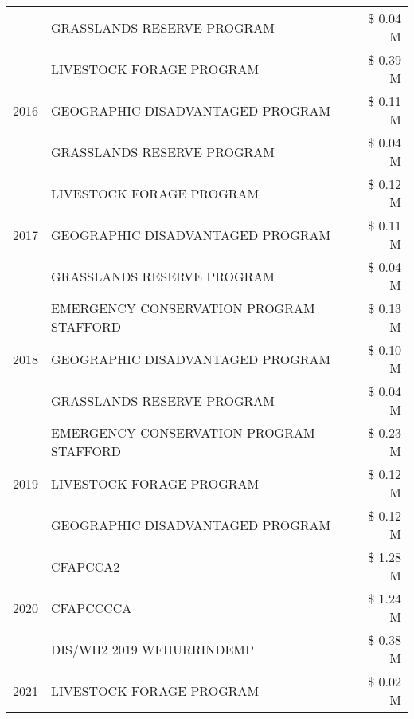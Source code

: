 \begin{tabular}{llr}
 & GRASSLANDS RESERVE PROGRAM & \$ 0.04 M \\
\cline{1-3}
\multirow[t]{3}{*}{2016} & LIVESTOCK FORAGE PROGRAM                      & \$ 0.39 M \\
 & GEOGRAPHIC DISADVANTAGED PROGRAM              & \$ 0.11 M \\
 & GRASSLANDS RESERVE PROGRAM                    & \$ 0.04 M \\
\cline{1-3}
\multirow[t]{3}{*}{2017} & LIVESTOCK FORAGE PROGRAM & \$ 0.12 M \\
 & GEOGRAPHIC DISADVANTAGED PROGRAM & \$ 0.11 M \\
 & GRASSLANDS RESERVE PROGRAM & \$ 0.04 M \\
\cline{1-3}
\multirow[t]{3}{*}{2018} & EMERGENCY CONSERVATION PROGRAM STAFFORD & \$ 0.13 M \\
 & GEOGRAPHIC DISADVANTAGED PROGRAM & \$ 0.10 M \\
 & GRASSLANDS RESERVE PROGRAM & \$ 0.04 M \\
\cline{1-3}
\multirow[t]{3}{*}{2019} & EMERGENCY CONSERVATION PROGRAM STAFFORD & \$ 0.23 M \\
 & LIVESTOCK FORAGE PROGRAM & \$ 0.12 M \\
 & GEOGRAPHIC DISADVANTAGED PROGRAM & \$ 0.12 M \\
\cline{1-3}
\multirow[t]{3}{*}{2020} & CFAPCCA2 & \$ 1.28 M \\
 & CFAPCCCCA & \$ 1.24 M \\
 & DIS/WH2 2019 WFHURRINDEMP & \$ 0.38 M \\
\cline{1-3}
2021 & LIVESTOCK FORAGE PROGRAM & \$ 0.02 M \\
\cline{1-3}
\bottomrule
\end{tabular}
